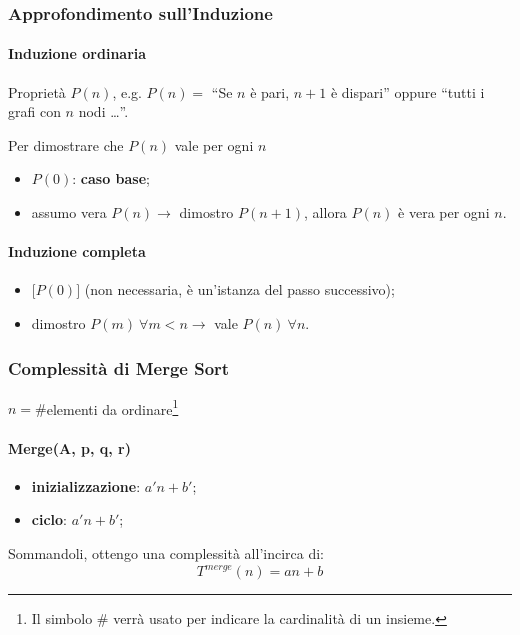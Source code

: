 \subsubsection{Approfondimento sull'Induzione}
\paragraph{Induzione ordinaria} 
Proprietà $P(n)$, e.g.  $P(n) = $ ``Se $n$ è pari, $n+1$ è dispari'' oppure 
``tutti i grafi con $n$ nodi \dots ''.\par
Per dimostrare che $P(n)$ vale per ogni $n$
\begin{itemize}
	\item $P(0)$: \textbf{caso base};
	\item assumo vera $P(n) \rightarrow $ dimostro $P(n+1)$, allora $P(n)$
	è vera per ogni $n$.
\end{itemize}

\paragraph{Induzione completa}
\begin{itemize}
	\item $\big[ P(0) \big]$ (non necessaria, è un'istanza del passo successivo);
	\item dimostro $P(m) \ \forall m<n \rightarrow $ vale $P(n) \ \forall n$.  
\end{itemize}

\subsubsection{Complessità di Merge Sort}

$n = \#$elementi da ordinare\footnote{Il simbolo \# verrà usato per indicare la cardinalità di un insieme.}

\paragraph{Merge(A, p, q, r)}
\begin{itemize}
	\item[] \textbf{inizializzazione}: $a'n+b'$;
	\item[] \textbf{ciclo}: $a'n+b'$;
\end{itemize}

Sommandoli, ottengo una complessità all'incirca di:
\begin{displaymath}
	T^{merge}(n) = an+b
\end{displaymath}

